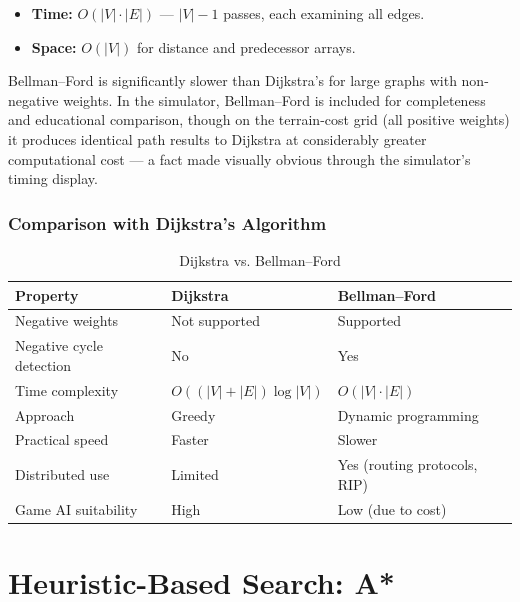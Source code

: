 \documentclass[12pt, a4paper, oneside]{report}
\theoremstyle{definition}
\begin{document}
\begin{itemize}
    \item \textbf{Time:} $O(|V| \cdot |E|)$ — $|V|-1$ passes, each examining all edges.
    \item \textbf{Space:} $O(|V|)$ for distance and predecessor arrays.
\end{itemize}

Bellman–Ford is significantly slower than Dijkstra's for large graphs with non-negative weights. In the simulator, Bellman–Ford is included for completeness and educational comparison, though on the terrain-cost grid (all positive weights) it produces identical path results to Dijkstra at considerably greater computational cost — a fact made visually obvious through the simulator's timing display.

\subsection{Comparison with Dijkstra's Algorithm}

\begin{table}[H]
\centering
\caption{Dijkstra vs. Bellman–Ford}
\label{tab:dijkstra_vs_bf}
\begin{tabular}{lll}
\toprule
\textbf{Property} & \textbf{Dijkstra} & \textbf{Bellman–Ford} \\
\midrule
Negative weights         & Not supported & Supported \\
Negative cycle detection & No            & Yes \\
Time complexity          & $O((|V|+|E|)\log|V|)$ & $O(|V| \cdot |E|)$ \\
Approach                 & Greedy        & Dynamic programming \\
Practical speed          & Faster        & Slower \\
Distributed use          & Limited       & Yes (routing protocols, RIP) \\
Game AI suitability      & High          & Low (due to cost) \\
\bottomrule
\end{tabular}
\end{table}

\chapter{Heuristic-Based Search: A*}
\end{document}
